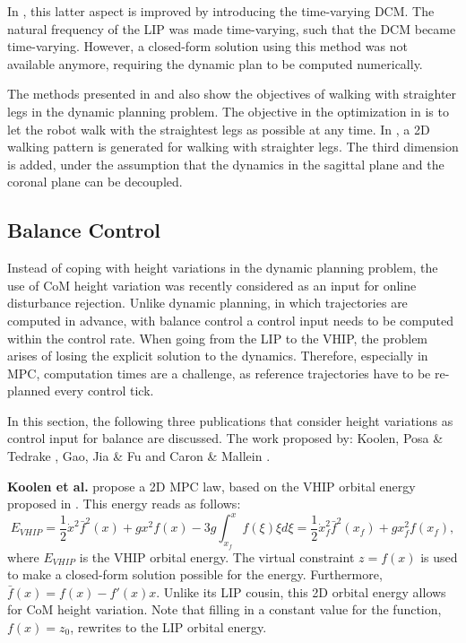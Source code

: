 In \cite{hopkins2014humanoid}, this latter aspect is improved by introducing the time-varying \ac{DCM}. The natural frequency of the \ac{LIP} was made time-varying, such that the \ac{DCM} became time-varying. However, a closed-form solution using this method was not available anymore, requiring the dynamic plan to be computed numerically.

The methods presented in \cite{brasseur2015robust} and \cite{kajita2017biped} also show the objectives of walking with straighter legs in the dynamic planning problem. The objective in the optimization in \cite{brasseur2015robust} is to let the robot walk with the straightest legs as possible at any time. In \cite{kajita2017biped}, a \ac{2D} walking pattern is generated for walking with straighter legs. The third dimension is added, under the assumption that the dynamics in the sagittal plane and the coronal plane can be decoupled. 
\subsection{Balance Control}\label{subsec:heightbalance}
Instead of coping with height variations in the dynamic planning problem, the use of \ac{CoM} height variation was recently considered as an input for online disturbance rejection. Unlike dynamic planning, in which trajectories are computed in advance, with balance control a control input needs to be computed within the control rate. When going from the \ac{LIP} to the \ac{VHIP}, the problem arises of losing the explicit solution to the dynamics. Therefore, especially in \ac{MPC}, computation times are a challenge, as reference trajectories have to be re-planned every control tick.

In this section, the following three publications that consider height variations as control input for balance are discussed. The work proposed by: Koolen, Posa \& Tedrake \cite{koolen2016balance},  Gao, Jia \& Fu \cite{gao2017increase} and  Caron \& Mallein \cite{caron2018balance}.

\textbf{Koolen et al.} \cite{koolen2016balance} propose a \ac{2D} \ac{MPC} law, based on the \ac{VHIP} orbital energy proposed in \cite{pratt2007derivation}. This energy reads as follows:
\begin{equation}\label{eq:evhip}
    E_{VHIP}  = \frac{1}{2}\dot{x}^2\bar{f}^2(x)+gx^2f(x) - 3g\int_{x_f}^{x} f(\xi)\xi d\xi = \frac{1}{2}\dot{x}_f^2\bar{f}^2(x_f)+gx_f^2f(x_f),
\end{equation}
where $E_{VHIP}$ is the \ac{VHIP} orbital energy. The virtual constraint $z=f(x)$ is used to make a closed-form solution possible for the energy. Furthermore, $\bar{f}(x)=f(x)-f'(x)x$. Unlike its \ac{LIP} cousin, this \ac{2D} orbital energy allows for \ac{CoM} height variation. Note that filling in a constant value for the function, $f(x)=z_0$, rewrites to the \ac{LIP} orbital energy.

